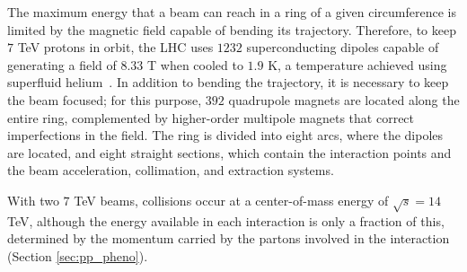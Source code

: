 The maximum energy that a beam can reach in a ring of a given circumference is limited by the magnetic field capable of bending its trajectory. Therefore, to keep $7$ TeV protons in orbit, the LHC uses $1232$ superconducting dipoles capable of generating a field of $8.33$ T when cooled to $1.9$ K, a temperature achieved using superfluid helium~\cite{Bruning:2004ej}. In addition to bending the trajectory, it is necessary to keep the beam focused; for this purpose, $392$ quadrupole magnets are located along the entire ring, complemented by higher-order multipole magnets that correct imperfections in the field. The ring is divided into eight arcs, where the dipoles are located, and eight straight sections, which contain the interaction points and the beam acceleration, collimation, and extraction systems.

With two $7$ TeV beams, collisions occur at a center-of-mass energy of $\sqrt{s}=14$ TeV, although the energy available in each interaction is only a fraction of this, determined by the momentum carried by the partons involved in the interaction (Section \ref{sec:pp_pheno}).\medskip



